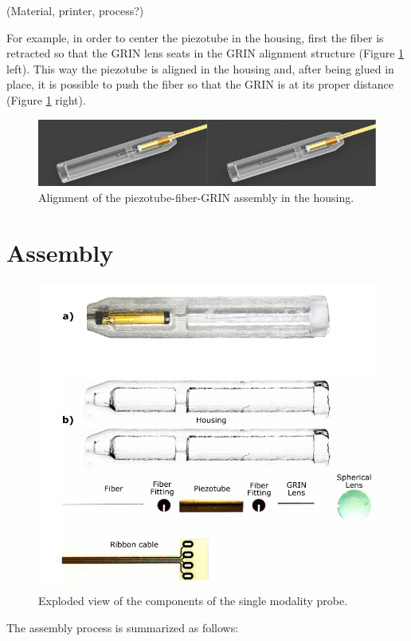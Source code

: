 (Material, printer, process?)

For example, in order to center the piezotube in the housing, first the fiber is retracted so that the GRIN lens seats in the GRIN alignment structure (Figure \ref{fig:grinAlignment} left). This way the piezotube is aligned in the housing and, after being glued in place, it is possible to push the fiber so that the GRIN is at its proper distance (Figure \ref{fig:grinAlignment} right). 

\begin{figure}[h!]\centering \includegraphics[width=\columnwidth]{figures/40_Fabrication/Housing/grinAlignment.pdf}
      \caption{Alignment of the piezotube-fiber-GRIN assembly in the housing.}
      \label{fig:grinAlignment}
\end{figure}

\clearpage
\section{Assembly}
\begin{figure}[h!]\centering \includegraphics{figures/40_Fabrication/Assy/exploded.pdf}
      \caption{Exploded view of the components of the single modality probe.}
      \label{fig:exploded}
\end{figure}
The assembly process is summarized as follows:

